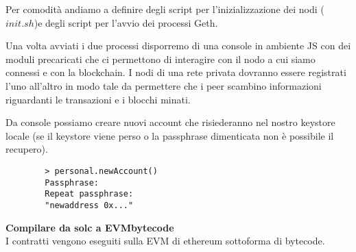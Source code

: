 \begin{appendices}
		Per comodità andiamo a definire degli script per l'inizializzazione dei nodi ($init.sh$)e degli script per l'avvio dei processi Geth.
		\iffalse
		\begin{lstlisting}
		\\nodo1
		geth --identity Node1 --etherbase 2a54983e9b648684676c4f78638654177cd4be6a --networkid 1234  --maxpeers 4 --datadir="chain"  -verbosity 6 --ipcdisable --port 30301 --rpc --rpcapi "db,eth,net,web3,personal" --rpcport 8101 --rpccorsdomain "*"  console --nat "any"  --autodag --preload "jsScript/function.js" 2>> ./chain/00.log
		
		\\nodo2
		geth --identity Node1 --etherbase 438dfd4dfd26a42961d878a1e27eb9f40abb0d19 --networkid 1234  --maxpeers 4 --datadir="chain"  -verbosity 6 --ipcdisable --port 30302 --rpc --rpcapi "db,eth,net,web3,personal" --rpcport 8102 --rpccorsdomain "*"  console --nat "any"  --autodag --preload "jsScript/function.js" 2>> ./chain/00.log
		
		\end{lstlisting}
		\fi
		
		Una volta avviati i due processi disporremo di una console in ambiente JS con dei moduli precaricati che ci permettono di interagire con il nodo a cui siamo connessi e con la blockchain.
		I nodi di una rete privata dovranno essere registrati l'uno all'altro in modo tale da permettere che i peer scambino informazioni riguardanti le transazioni e i blocchi minati.
		
		
		\iffalse
		1>admin.nodeInfo
		1>enode:\\....................[::]
		
		2>net.listening
		2>net.peerCount 
		2>admin.addPeer("enode:\\ .......... ")
		2>admin.peers
		\fi
		
		Da console possiamo creare nuovi account che risiederanno nel nostro keystore locale (se il keystore viene perso o la passphrase dimenticata non è possibile il recupero).
		
		\begin{lstlisting}
		> personal.newAccount()
		Passphrase: 
		Repeat passphrase: 
		"newaddress 0x..."
		\end{lstlisting}
		
		
		\textbf{Compilare da solc a EVMbytecode}\\
		
		I contratti vengono eseguiti sulla EVM di ethereum sottoforma di bytecode.
		

\end{appendices}
